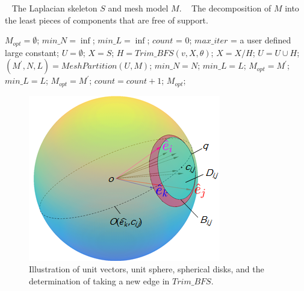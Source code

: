 \begin{algorithm}
\caption{$Skeleton\_Mesh\_Decomposition(S, M)$}
\label{alg:Framwork}
\begin{algorithmic}[1]
\REQUIRE~
The Laplacian skeleton $S$ and mesh model $M$.
\ENSURE~
The decomposition of $M$ into the least pieces of components that are free of support.

\STATE $M_{opt} = \emptyset$; $min\_N = \inf$; $min\_L = \inf$; $count$ = 0; $max\_iter$ = a user defined large constant;
\STATE  $U= \emptyset$;
\STATE  $X= S$;
\STATE $H = Trim\_BFS(v, X, \theta)$;
\STATE $X = X / H$;
\STATE $U = U \cup H$;
\ENDWHILE
\STATE $(M^{'}, N, L) = MeshPartition(U , M)$;
\STATE  $min\_N = N$;
\STATE  $min\_L = L$;
\STATE  $M_{opt} = M^{'}$;
\STATE  $min\_L = L$;
\STATE  $M_{opt} = M^{'}$;
\ENDIF
\STATE $count =count + 1$;
\ENDWHILE
\RETURN  $M_{opt}$;
\label{code:fram:select} \\
\end{algorithmic}
\end{algorithm}

\begin{figure}[b]
  \centering
  \includegraphics[width=0.7\linewidth]{figs/take_arc.png}
  \caption{\label{fig:sphere}%
           Illustration of unit vectors, unit sphere, spherical disks, and the determination of taking a new edge in $Trim\_BFS$.}
\end{figure}

